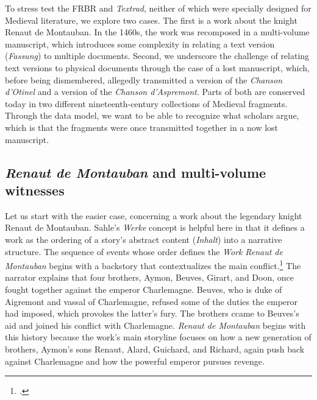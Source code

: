 To stress test the FRBR and \textit{Textrad}, neither of which were specially designed for Medieval literature, we explore two cases. The first is a work about the knight Renaut de Montauban. In the 1460s, the work was recomposed in a multi-volume manuscript, which introduces some complexity in relating a text version (\textit{Fassung}) to multiple documents. Second, we underscore the challenge of relating text versions to physical documents through the case of a lost manuscript, which, before being dismembered, allegedly transmitted a version of the \textit{Chanson d'Otinel} and a version of the \textit{Chanson d'Aspremont}. Parts of both are conserved today in two different nineteenth-century collections of Medieval fragments. Through the data model, we want to be able to recognize what scholars argue, which is that the fragments were once transmitted together in a now lost manuscript.

\subsection{\textit{Renaut de Montauban} and multi-volume witnesses}

Let us start with the easier case, concerning a work about the legendary knight Renaut de Montauban. Sahle's \textit{Werke} concept is helpful here in that it defines a work as the ordering of a story's abstract content (\textit{Inhalt}) into a narrative structure. The sequence of events whose order defines the \textit{Work} \textit{Renaut de Montauban} begins with a backstory that contextualizes the main conflict.\footcite[Whether this opening section constitutes a prologue, in alignment with the generic expectations of a prologue for \textit{chansons de geste}, is the subject of scholarly debate.][]{Leverage2000} The narrator explains that four brothers, Aymon, Beuves, Girart, and Doon, once fought together against the emperor Charlemagne. Beuves, who is duke of Aigremont and vassal of Charlemagne, refused some of the duties the emperor had imposed, which provokes the latter's fury. The brothers ccame to Beuves's aid and joined his conflict with Charlemagne. \textit{Renaut de Montauban} begins with this history because the work's main storyline focuses on how a new generation of brothers, Aymon's sons Renaut, Alard, Guichard, and Richard, again push back against Charlemagne and how the powerful emperor pursues revenge.\footnotemark{}

